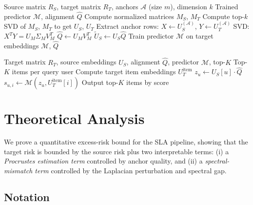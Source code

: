\documentclass[conference]{IEEEtran}
\begin{document}
\begin{algorithm}[t]
\caption{SLA -- Training}
\begin{algorithmic}[1]
\REQUIRE Source matrix $R_S$, target matrix $R_T$, anchors $\mathcal{A}$ (size $m$), dimension $k$
\ENSURE Trained predictor $\mathcal{M}$, alignment $\hat{Q}$
\STATE Compute normalized matrices $M_S$, $M_T$
\STATE Compute top-$k$ SVD of $M_S$, $M_T$ to get $U_S$, $U_T$
\STATE Extract anchor rows: $X \leftarrow U_S^{(\mathcal{A})}$, $Y \leftarrow U_T^{(\mathcal{A})}$
\STATE SVD: $X^T Y = U_M \Sigma_M V_M^T$
\STATE $\hat{Q} \leftarrow U_M V_M^T$
\STATE $\tilde{U}_S \leftarrow U_S \hat{Q}$
\STATE Train predictor $\mathcal{M}$ on target embeddings
\RETURN $\mathcal{M}$, $\hat{Q}$
\end{algorithmic}
\end{algorithm}

\begin{algorithm}[t]
\caption{SLA -- Inference}
\begin{algorithmic}[1]
\REQUIRE Target matrix $R_T$, source embeddings $U_S$, alignment $\hat{Q}$, predictor $\mathcal{M}$, top-$K$
\ENSURE Top-$K$ items per query user
\STATE Compute target item embeddings $U_T^{\text{item}}$
    \STATE $z_u \leftarrow U_S[u] \cdot \hat{Q}$ 
        \STATE $s_{u,i} \leftarrow \mathcal{M}(z_u, U_T^{\text{item}}[i])$
    \ENDFOR
    \STATE Output top-$K$ items by score
\ENDFOR
\end{algorithmic}
\end{algorithm}


\section{Theoretical Analysis}

We prove a quantitative excess-risk bound for the SLA pipeline, showing that the target risk is bounded by the source risk plus two interpretable terms: (i) a \emph{Procrustes estimation term} controlled by anchor quality, and (ii) a \emph{spectral-mismatch term} controlled by the Laplacian perturbation and spectral gap.

\subsection{Notation}
\end{document}
